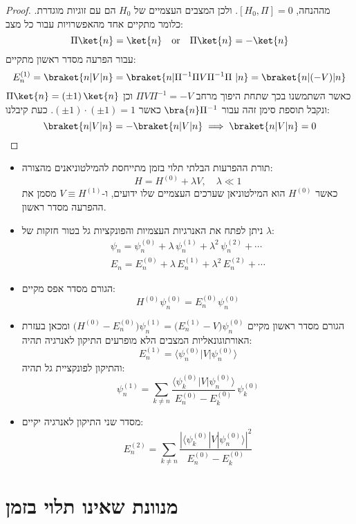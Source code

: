 \documentclass{tstextbook}
\begin{document}
\begin{proof}
מההנחה, \(\left[ H_{0},\Pi \right]=0\). ולכן המצבים העצמיים של \(H_{0}\) הם עם זוגיות מוגדרת. כלומר מתקיים אחד מהאפשרויות עבור כל מצב:
$$\Pi \ket{n} =\ket{n} \quad \text{or}\quad \Pi \ket{n} =-\ket{n} $$
עבור הפרעה מסדר ראשון מתקיים:
$$E^{(1)}_{n}=\braket{ n | V|n } =\braket{ n|\Pi ^{-1} \Pi V\Pi ^{-1}\Pi  | n }= \braket{ n | (-V)|n } $$
כאשר השתמשנו בכך שתחת היפוך מרחב \(\Pi V\Pi ^{-1} = -V\) וכן \(\Pi \ket{n}=\left( \pm 1 \right)\ket{n}\) ונקבל תוספת סימן זהה עבור \(\bra{n}\Pi ^{-1}\) כאשר \(\left( \pm 1 \right)\cdot\left( \pm 1 \right)=1\). כעת קיבלנו:
$$\braket{ n|V | n } =-\braket{ n|V | n } \implies \braket{ n|V | n } =0$$

\end{proof}
\begin{summary}
  \begin{itemize}
    \item תורת ההפרעות הבלתי תלוי בזמן מתייחסת להמילטוניאנים מהצורה:
$$H=H^{(0)}+\lambda V,\quad\lambda\ll1$$
כאשר \(H^{(0)}\) הוא המילטוניאן שערכים העצמיים שלו ידועים, ו-\(V \equiv H^{(1)}\) מסמן את ההפרעה מסדר ראשון.
    \item ניתן לפתח את האנרגיות העצמיות והפונקציות גל בטור חזקות של \(\lambda\):
$$\begin{array}{l} {{\psi_{n}=\psi_{n}^{(0)}+\lambda\,\psi_{n}^{(1)}+\lambda^{2}\,\psi_{n}^{(2)}+\cdots}}\\ {{E_{n}=E_{n}^{(0)}+\lambda\,E_{n}^{(1)}+\lambda^{2}\,E_{n}^{(2)}+\cdots}}\end{array}$$
    \item הגורם מסדר אפס מקיים:
$$H^{(0)}\psi_{n}^{(0)}=E_{n}^{(0)}\psi_{n}^{(0)}$$
    \item הגורם מסדר ראשון מקיים \(\big(H^{(0)}-E_{n}^{(0)}\big)\psi_{n}^{(1)}=\big(E_{n}^{(1)}-V\big)\psi_{n}^{(0)}\) ומכאן בעזרת האורתוגונאליות המצבים הלא מופרעים התיקון לאנרגיה תהיה:
$$E_{n}^{(1)}=\langle\psi_{n}^{(0)}|V|\psi_{n}^{(0)}\rangle$$
והתיקון לפונקציית גל תהיה:
$$\psi_{n}^{(1)}=\sum_{k\neq n}\frac{\langle\psi_{k}^{(0)}|V|\psi_{n}^{(0)}\rangle}{E_{n}^{(0)}-E_{k}^{(0)}}\,\psi_{k}^{(0)}$$
    \item מסדר שני התיקון לאנרגיה יקיים:
$$E_{n}^{(2)}=\sum_{k\neq n}\frac{|\langle\psi_{k}^{(0)}|V|\psi_{n}^{(0)}\rangle|^{2}}{E_{n}^{(0)}-E_{k}^{(0)}}$$
  \end{itemize}
\end{summary}
\section{מנוונת שאינו תלוי בזמן}
\end{document}
